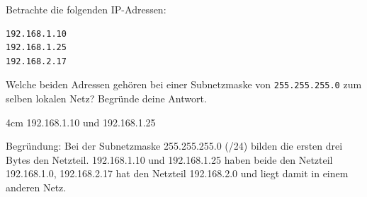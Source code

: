 \question[3]
Betrachte die folgenden IP-Adressen:

\begin{lstlisting}
192.168.1.10
192.168.1.25
192.168.2.17
\end{lstlisting}

Welche beiden Adressen gehören bei einer Subnetzmaske von
\texttt{255.255.255.0} zum selben lokalen Netz? Begründe deine Antwort.

\begin{solutionbox}{4cm}
192.168.1.10 und
192.168.1.25

Begründung: Bei der Subnetzmaske 255.255.255.0 (/24) bilden die ersten drei Bytes den Netzteil.
192.168.1.10 und 192.168.1.25 haben beide den Netzteil 192.168.1.0,
192.168.2.17 hat den Netzteil 192.168.2.0 und liegt damit in einem anderen Netz.
\end{solutionbox}
